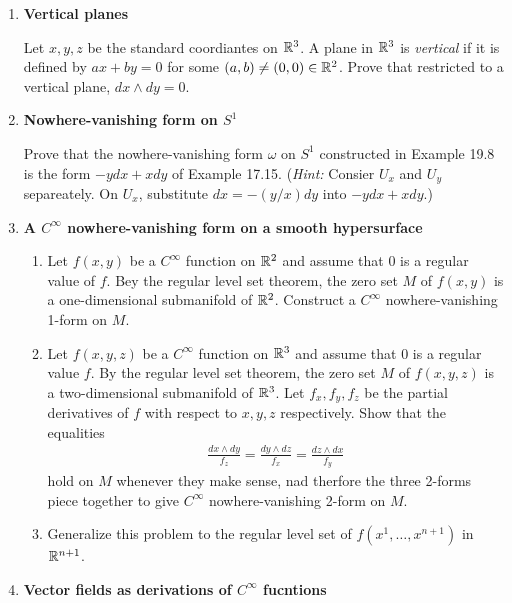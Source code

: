 \documentclass[12pt,a4paper]{report}
\begin{document}
\begin{enumerate}[label=19.\arabic*]
\begin{enumerate}[label=(\alph*)]
\end{enumerate}

\item \textbf{Vertical planes}

Let $x,y,z$ be the standard coordiantes on $\mathbb{R}^3$.  A plane in $\mathbb{R}^3$ is 	\textit{vertical} if it is defined by $ax+by=0$ for some $(a,b) \ne (0,0) \in \mathbb{R}^2$.  Prove that restricted to a vertical plane, $dx \wedge dy =0$.

\item \textbf{Nowhere-vanishing form on $S^1$}

Prove that the nowhere-vanishing form $\omega$ on $S^1$ constructed in Example 19.8 is the form $-ydx+xdy$ of Example 17.15.  (\textit{Hint:} Consier $U_x$ and $U_y$ separeately.  On $U_x$, substitute $dx=-(y/x)dy$ into $-ydx+xdy$.)

\item \textbf{A $C^\infty$ nowhere-vanishing form on a smooth hypersurface}

\begin{enumerate}[label=(\alph*)]

	\item Let $f(x,y)$ be a $C^\infty$ function on $\mathbb{R}^2$ and assume that 0 is a regular value of $f$.  Bey the regular level set theorem, the zero set $M$ of $f(x,y)$ is a one-dimensional submanifold of $\mathbb{R}^2$. Construct a $C^\infty$ nowhere-vanishing 1-form on $M$.
	
	\item Let $f(x,y,z)$ be a $C^\infty$ function on $\mathbb{R}^3$ and assume that 0 is a regular value $f$.  By the regular level set theorem, the zero set $M$ of $f(x,y,z)$ is a two-dimensional submanifold of $\mathbb{R}^3$.  Let $f_x, f_y, f_z$ be the partial derivatives of $f$ with respect to $x,y,z$ respectively.  Show that the equalities
	\begin{align*}
		\frac{dx\wedge dy}{f_z}=\frac{dy\wedge dz}{f_x}=\frac{dz\wedge dx}{f_y}
	\end{align*}hold on $M$ whenever they make sense, nad therfore the three 2-forms piece together to give $C^\infty$ nowhere-vanishing 2-form on $M$.
	
	\item Generalize this problem to the regular level set of $f(x^1,\dots,x^{n+1})$ in $\mathbb{R}^{n+1}$.

\end{enumerate}

\item \textbf{Vector fields as derivations of $C^\infty$ fucntions}


\end{enumerate}
\end{document}
